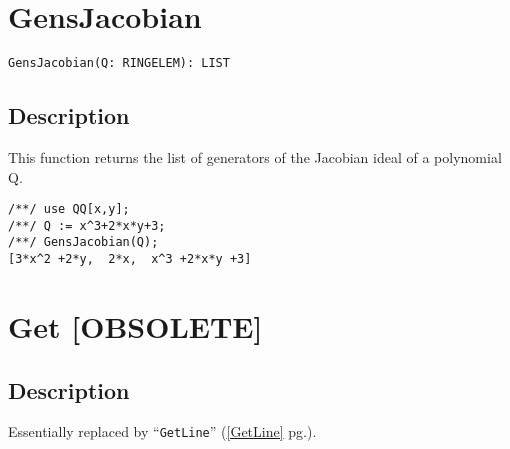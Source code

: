 \documentclass[a4paper]{mybook}
\newenvironment{command}{}{} %
\begin{document}
\section{GensJacobian}
\label{GensJacobian}
\begin{command} %


\begin{Verbatim}[label=syntax, rulecolor=\color{MidnightBlue},
frame=single]
GensJacobian(Q: RINGELEM): LIST 
\end{Verbatim}


\subsection*{Description}

This function returns the list of generators of the Jacobian ideal of a polynomial Q.
\begin{Verbatim}[label=example, rulecolor=\color{PineGreen}, frame=single]
/**/ use QQ[x,y];	
/**/ Q := x^3+2*x*y+3;
/**/ GensJacobian(Q);
[3*x^2 +2*y,  2*x,  x^3 +2*x*y +3]
\end{Verbatim}


\end{command} %

\section{Get [OBSOLETE]}
\label{Get [OBSOLETE]}
\begin{command} %



\subsection*{Description}

Essentially replaced by ``\verb&GetLine&'' (\ref{GetLine} pg.\pageref{GetLine}).

\end{command} %
\end{document}

